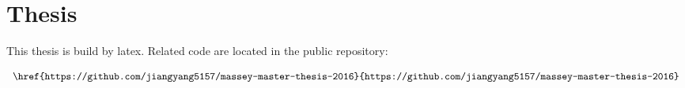\label{appendix-thesis}
\chapter{Thesis}

This thesis is build by latex. Related code are located in the public repository:

\[
\begin{array}{lr}
\begin{aligned}
&\code{\href{https://github.com/jiangyang5157/massey-master-thesis-2016}{https://github.com/jiangyang5157/massey-master-thesis-2016}}\\
\end{aligned}
\end{array}
\]

